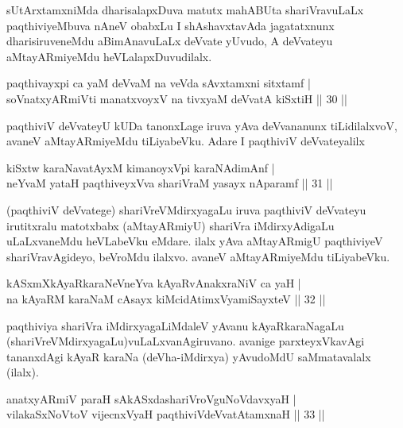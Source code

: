 \begin{artha}
sUtArxtamxniMda dharisalapxDuva matutx mahABUta shariVravuLaLx paqthiviyeMbuva nAneV obabxLu I shAshavxtavAda jagatatxnunx dharisiruveneMdu aBimAnavuLaLx deVvate yUvudo, A deVvateyu aMtayARmiyeMdu heVLalapxDuvudilalx.
\end{artha}

\begin{shl}
paqthivayxpi ca yaM deVvaM na veVda sAvxtamxni sitxtamf |\\
soV\s natxyARmiVti manatxvoyxV na tivxyaM deVvatA kiSxtiH \hfill || 30 ||
\end{shl}

\begin{artha}
paqthiviV deVvateyU kUDa tanonxLage iruva yAva deVvananunx tiLidilalxvoV, avaneV aMtayARmiyeMdu tiLiyabeVku. Adare I paqthiviV deVvateyalilx
\end{artha}


\begin{shl}
kiSxtw karaNavatAyxM kimanoyxV\s pi karaNAdimAnf |\\
neYvaM yataH paqthiveyxVva shariVraM yasayx nAparamf \hfill || 31 ||
\end{shl}

\begin{artha}
(paqthiviV deVvatege) shariVreVMdirxyagaLu iruva paqthiviV deVvateyu irutitx\-ralu matotxbabx (aMtayARmiyU) shariVra iMdirxyAdigaLu uLaLxvaneMdu heVLa\-beVku eMdare. ilalx yAva aMtayARmigU paqthiviyeV shariVravAgideyo, beVroMdu ilalxvo. avaneV aMtayARmiyeMdu tiLiyabeVku.
\end{artha}

\begin{shl}
kASxmXkAyaRkaraNeVneYva kAyaRvAnakxraNiV ca yaH |\\
na kAyaRM karaNaM cAsayx kiMcidAtimxVyamiSayxteV \hfill || 32 ||
\end{shl}

\begin{artha}
paqthiviya shariVra iMdirxyagaLiMdaleV yAvanu kAyaRkaraNagaLu (shariVreVMdirx\-yagaLu)vuLaLxvanAgiruvano. avanige parxteyxVkavAgi tananxdAgi kAyaR karaNa (deVha\--iMdirxya) yAvudoMdU saMmatavalalx (ilalx).
\end{artha}


\begin{shl}
anatxyARmiV paraH sAkASxdashariVroV\s guNoV\s davxyaH |\\
vilakaSxNoV\s toV vijecnxVyaH paqthiviVdeVvatAtamxnaH \hfill || 33 ||
\end{shl}

